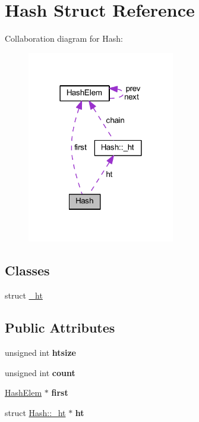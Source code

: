 \hypertarget{struct_hash}{\section{Hash Struct Reference}
\label{struct_hash}
}


Collaboration diagram for Hash\-:\nopagebreak
\begin{figure}[H]
\begin{center}
\leavevmode
\includegraphics[width=182pt]{struct_hash__coll__graph}
\end{center}
\end{figure}
\subsection*{Classes}
\begin{DoxyCompactItemize}
\item 
struct \hyperlink{struct_hash_1_1__ht}{\-\_\-ht}
\end{DoxyCompactItemize}
\subsection*{Public Attributes}
\begin{DoxyCompactItemize}
\item 
\hypertarget{struct_hash_a072258e24a38e09175f1308deb013bc8}{unsigned int {\bfseries htsize}}\label{struct_hash_a072258e24a38e09175f1308deb013bc8}

\item 
\hypertarget{struct_hash_a7ab16f173cdc347ffbe39eaa85ee6fda}{unsigned int {\bfseries count}}\label{struct_hash_a7ab16f173cdc347ffbe39eaa85ee6fda}

\item 
\hypertarget{struct_hash_a2cfc9936ca2a624c6492ab6557f4705b}{\hyperlink{struct_hash_elem}{Hash\-Elem} $\ast$ {\bfseries first}}\label{struct_hash_a2cfc9936ca2a624c6492ab6557f4705b}

\item 
\hypertarget{struct_hash_ac0f36e03746a3fe69643db08d93bc0c4}{struct \hyperlink{struct_hash_1_1__ht}{Hash\-::\-\_\-ht} $\ast$ {\bfseries ht}}\label{struct_hash_ac0f36e03746a3fe69643db08d93bc0c4}

\end{DoxyCompactItemize}


